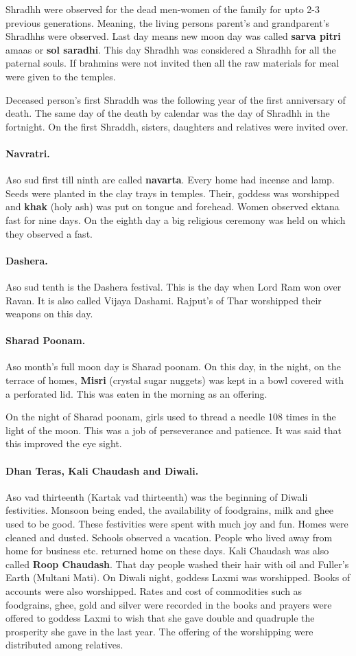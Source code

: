 Shradhh were observed for the dead men-women of the family for upto 2-3
previous generations. Meaning, the living persons parent's and grandparent's
Shradhhs were observed. Last day means new moon day was called \textbf{sarva
pitri} amaas or \textbf{sol saradhi}. This day Shradhh was considered a Shradhh
for all the paternal souls. If brahmins were not invited then all the raw
materials for meal were given to the temples.

Deceased person's first Shraddh was the following year of the first anniversary
of death. The same day of the death by calendar was the day of Shradhh in the
fortnight. On the first Shraddh, sisters, daughters and relatives were invited
over. 
\paragraph{Navratri.} Aso sud first till ninth are called \textbf{navarta}.
Every home had incense and lamp. Seeds were planted in the clay trays in
temples. Their, goddess was worshipped and \textbf{khak} (holy ash) was put on
tongue and forehead. Women observed ektana fast for nine days. On the eighth day
a big religious ceremony was held on which they observed a fast.
\paragraph{Dashera.} Aso sud tenth is the Dashera festival. This is the day when
Lord Ram won over Ravan. It is also called Vijaya Dashami. Rajput's of Thar
worshipped their weapons on this day.
\paragraph{Sharad Poonam.} Aso month's full moon day is Sharad poonam. On this
day, in the night, on the terrace of homes, \textbf{Misri} (crystal sugar
nuggets) was kept in a bowl covered with a perforated lid. This was eaten in the
morning as an offering.

On the night of Sharad poonam, girls used to thread a needle 108 times in the
light of the moon. This was a job of perseverance and patience. It was said that
this improved the eye sight.
\paragraph{Dhan Teras, Kali Chaudash and Diwali.} Aso vad thirteenth (Kartak vad
thirteenth) was the beginning of Diwali festivities. Monsoon being ended, the
availability of foodgrains, milk and ghee used to be good. These festivities
were spent with much joy and fun. Homes were cleaned and dusted. Schools
observed a vacation. People who lived away from home for business etc. returned
home on these days. Kali Chaudash was also called \textbf{Roop Chaudash}. That
day people washed their hair with oil and Fuller's Earth (Multani Mati). On Diwali
night, goddess Laxmi was worshipped. Books of accounts were also worshipped.
Rates and cost of commodities such as foodgrains, ghee, gold and silver were
recorded in the books and prayers were offered to goddess Laxmi to wish that she
gave double and quadruple the prosperity she gave in the last year. The offering
of the worshipping were distributed among relatives.

